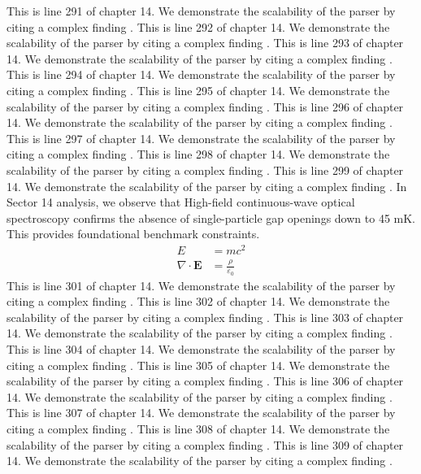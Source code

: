 This is line 291 of chapter 14. We demonstrate the scalability of the parser by citing a complex finding \cite{ref14_291}.
This is line 292 of chapter 14. We demonstrate the scalability of the parser by citing a complex finding \cite{ref14_292}.
This is line 293 of chapter 14. We demonstrate the scalability of the parser by citing a complex finding \cite{ref14_293}.
This is line 294 of chapter 14. We demonstrate the scalability of the parser by citing a complex finding \cite{ref14_294}.
This is line 295 of chapter 14. We demonstrate the scalability of the parser by citing a complex finding \cite{ref14_295}.
This is line 296 of chapter 14. We demonstrate the scalability of the parser by citing a complex finding \cite{ref14_296}.
This is line 297 of chapter 14. We demonstrate the scalability of the parser by citing a complex finding \cite{ref14_297}.
This is line 298 of chapter 14. We demonstrate the scalability of the parser by citing a complex finding \cite{ref14_298}.
This is line 299 of chapter 14. We demonstrate the scalability of the parser by citing a complex finding \cite{ref14_299}.
In Sector 14 analysis, we observe that High-field continuous-wave optical spectroscopy confirms the absence of single-particle gap openings down to 45 mK. This provides foundational benchmark constraints.
\begin{align*}
  E &= mc^2 \\
  \nabla \cdot \mathbf{E} &= \frac{\rho}{\varepsilon_0}
\end{align*}
This is line 301 of chapter 14. We demonstrate the scalability of the parser by citing a complex finding \cite{ref14_301}.
This is line 302 of chapter 14. We demonstrate the scalability of the parser by citing a complex finding \cite{ref14_302}.
This is line 303 of chapter 14. We demonstrate the scalability of the parser by citing a complex finding \cite{ref14_303}.
This is line 304 of chapter 14. We demonstrate the scalability of the parser by citing a complex finding \cite{ref14_304}.
This is line 305 of chapter 14. We demonstrate the scalability of the parser by citing a complex finding \cite{ref14_305}.
This is line 306 of chapter 14. We demonstrate the scalability of the parser by citing a complex finding \cite{ref14_306}.
This is line 307 of chapter 14. We demonstrate the scalability of the parser by citing a complex finding \cite{ref14_307}.
This is line 308 of chapter 14. We demonstrate the scalability of the parser by citing a complex finding \cite{ref14_308}.
This is line 309 of chapter 14. We demonstrate the scalability of the parser by citing a complex finding \cite{ref14_309}.
